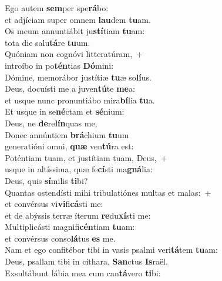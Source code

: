 \evenverse Ego autem \textbf{sem}per spe\textbf{rá}bo:~\*\\
\evenverse et adjíciam super omnem \textbf{lau}dem \textbf{tu}am.\\
\oddverse Os meum annuntiábit ju\textbf{stí}tiam \textbf{tu}am:~\*\\
\oddverse tota die salu\textbf{tá}re \textbf{tu}um.\\
\evenverse Quóniam non cognóvi litteratúram,~+\\
\evenverse  introíbo in po\textbf{tén}tias \textbf{Dó}mini:~\*\\
\evenverse Dómine, memorábor justítiæ \textbf{tu}æ so\textbf{lí}us.\\
\oddverse Deus, docuísti me a juven\textbf{tú}te \textbf{me}a:~\*\\
\oddverse et usque nunc pronuntiábo mira\textbf{bí}lia \textbf{tu}a.\\
\evenverse Et usque in se\textbf{né}ctam et \textbf{sé}nium:~\*\\
\evenverse Deus, ne \textbf{de}re\textbf{lín}quas me,\\
\oddverse Donec annúntiem \textbf{brá}chium \textbf{tu}um~\*\\
\oddverse generatióni omni, \textbf{quæ} ven\textbf{tú}ra est:\\
\evenverse Poténtiam tuam, et justítiam tuam, Deus,~+\\
\evenverse  usque in altíssima, quæ fe\textbf{cí}sti ma\textbf{gná}lia:~\*\\
\evenverse Deus, quis \textbf{sí}milis \textbf{ti}bi?\\
\oddverse Quantas ostendísti mihi tribulatiónes multas et malas:~+\\
\oddverse  et convérsus vi\textbf{vi}fi\textbf{cá}sti me:~\*\\
\oddverse et de abýssis terræ íterum \textbf{re}du\textbf{xí}sti me:\\
\evenverse Multiplicásti magnifi\textbf{cén}tiam \textbf{tu}am:~\*\\
\evenverse et convérsus conso\textbf{lá}tus \textbf{es} me.\\
\oddverse Nam et ego confitébor tibi in vasis psalmi veri\textbf{tá}tem \textbf{tu}am:~\*\\
\oddverse Deus, psallam tibi in cíthara, \textbf{San}ctus \textbf{Is}raël.\\
\evenverse Exsultábunt lábia mea cum can\textbf{tá}vero \textbf{ti}bi:~\*\\
